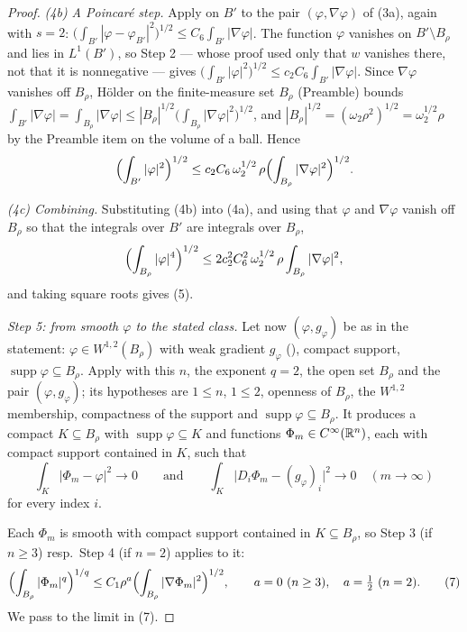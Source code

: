 \begin{proof}
\emph{(4b) A Poincar\'e step.}  Apply  on
$B'$ to the pair $(\varphi,\nabla\varphi)$ of (3a), again with $s=2$:
$\bigl(\int_{B'}|\varphi-\varphi_{B'}|^{2}\bigr)^{1/2}\le
C_6\int_{B'}|\nabla\varphi|$.  The function $\varphi$ vanishes on
$B'\setminus B_\rho$ and lies in $L^1(B')$, so Step 2 --- whose proof used only
that $w$ vanishes there, not that it is nonnegative --- gives
$\bigl(\int_{B'}|\varphi|^{2}\bigr)^{1/2}\le c_2C_6\int_{B'}|\nabla\varphi|$.
Since $\nabla\varphi$ vanishes off $B_\rho$, H\"older on the finite-measure set
$B_\rho$ (Preamble) bounds
$\int_{B'}|\nabla\varphi|=\int_{B_\rho}|\nabla\varphi|
\le|B_\rho|^{1/2}\bigl(\int_{B_\rho}|\nabla\varphi|^2\bigr)^{1/2}$, and
$|B_\rho|^{1/2}=(\omega_2\rho^2)^{1/2}=\omega_2^{1/2}\rho$ by the Preamble item
on the volume of a ball.  Hence
\[
\Bigl(\int_{B'}|\varphi|^{2}\Bigr)^{1/2}
\le c_2C_6\,\omega_2^{1/2}\,\rho\Bigl(\int_{B_\rho}|\nabla\varphi|^2\Bigr)^{1/2}.
\]

\emph{(4c) Combining.}  Substituting (4b) into (4a), and using that $\varphi$
and $\nabla\varphi$ vanish off $B_\rho$ so that the integrals over $B'$ are
integrals over $B_\rho$,
\[
\Bigl(\int_{B_\rho}|\varphi|^{4}\Bigr)^{1/2}
\le2c_2^2C_6^2\,\omega_2^{1/2}\,\rho\int_{B_\rho}|\nabla\varphi|^2 ,
\]
and taking square roots gives (5).

\emph{Step 5: from smooth $\varphi$ to the stated class.}  Let now
$(\varphi,g_\varphi)$ be as in the statement: $\varphi\in W^{1,2}(B_\rho)$ with
weak gradient $g_\varphi$ (), compact support,
$\operatorname{supp}\varphi\subseteq B_\rho$.  Apply
 with this $n$, the exponent $q=2$, the open
set $B_\rho$ and the pair $(\varphi,g_\varphi)$; its hypotheses are $1\le n$,
$1\le2$, openness of $B_\rho$, the $W^{1,2}$ membership, compactness of the
support and $\operatorname{supp}\varphi\subseteq B_\rho$.  It produces a compact
$K\subseteq B_\rho$ with $\operatorname{supp}\varphi\subseteq K$ and functions
$\Phi_m\in C^\infty(\mathbb{R}^n)$, each with compact support contained in $K$, such
that
\[
\int_K|\Phi_m-\varphi|^2\to0
\qquad\text{and}\qquad
\int_K\bigl|D_i\Phi_m-(g_\varphi)_i\bigr|^2\to0
\quad(m\to\infty)
\tag{6}
\]
for every index $i$.

Each $\Phi_m$ is smooth with compact support contained in
$K\subseteq B_\rho$, so Step 3 (if $n\ge3$) resp.\ Step 4 (if $n=2$) applies to
it:
\[
\Bigl(\int_{B_\rho}|\Phi_m|^{q}\Bigr)^{1/q}
\le C_1\rho^{a}\Bigl(\int_{B_\rho}|\nabla\Phi_m|^2\Bigr)^{1/2},
\qquad a=0\ (n\ge3),\quad a=\tfrac12\ (n=2).
\tag{7}
\]
We pass to the limit in (7).


\end{proof}
